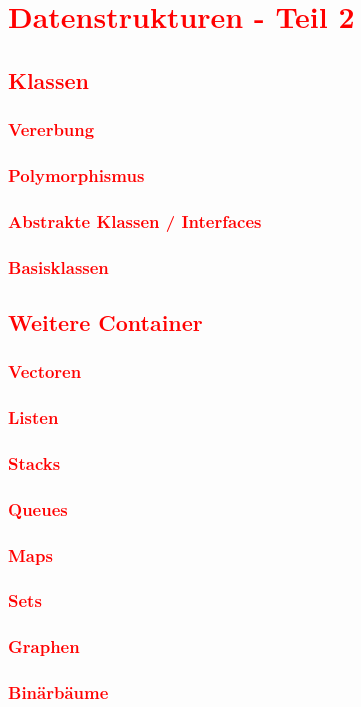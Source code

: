 \cleardoublepage\chapter{\textcolor{red}{Datenstrukturen - Teil 2}}\label{chap:datastructures-2}
\section{\textcolor{red}{Klassen}}\label{sec:classes-2}
\subsection{\textcolor{red}{Vererbung}}\label{sec:inheritance}
\subsection{\textcolor{red}{Polymorphismus}}\label{sec:polymorphism}
\subsection{\textcolor{red}{Abstrakte Klassen / Interfaces}}\label{sec:abstract-classes}
\subsection{\textcolor{red}{Basisklassen}}\label{sec:base-classes}
\section{\textcolor{red}{Weitere Container}}\label{sec:containers}
\subsection{\textcolor{red}{Vectoren}}\label{sec:vectors}
\subsection{\textcolor{red}{Listen}}\label{sec:lists}
\subsection{\textcolor{red}{Stacks}}\label{sec:stacks}
\subsection{\textcolor{red}{Queues}}\label{sec:queues}
\subsection{\textcolor{red}{Maps}}\label{sec:maps}
\subsection{\textcolor{red}{Sets}}\label{sec:sets}
\subsection{\textcolor{red}{Graphen}}\label{sec:trees}
\subsection{\textcolor{red}{Binärbäume}}\label{sec:binary-trees}

